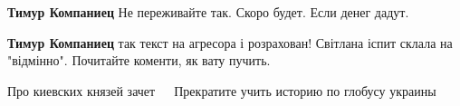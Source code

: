\begin{itemize}
\begin{itemize}
\textbf{Тимур Компаниец}
Не переживайте так. Скоро будет. Если денег дадут.

 
\textbf{Тимур Компаниец} так текст на агресора і розрахован! Світлана іспит склала на "відмінно". Почитайте коменти, як вату пучить.

 
Про киевских князей зачет 🤣🤣🤣 Прекратите учить историю по глобусу украины

\end{itemize}

\end{itemize}

